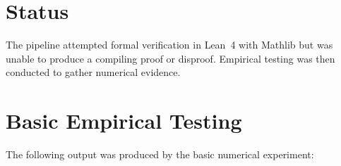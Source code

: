 \documentclass[11pt]{article}
\begin{document}
\section{Status}

\begin{center}
\end{center}

The pipeline attempted formal verification in Lean~4 with Mathlib but was unable to
produce a compiling proof or disproof. Empirical testing was then conducted to gather
numerical evidence.

\section{Basic Empirical Testing}

The following output was produced by the basic numerical experiment:
\end{document}
